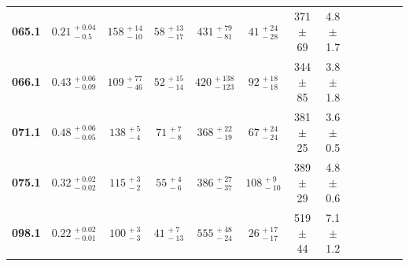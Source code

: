 \begin{table}
{\begin{tabular}{lcccccccccccc}
	\textbf{065.1} & $0.21_{\, -0.5}^{\, +0.04}$ & $158_{\, -10}^{\, +14}$ & $58_{\, -17}^{\, +13}$ & $431_{\, -81}^{\, +79}$ & $41_{\, -28}^{\, +24}$ & 371 $\pm$ 69 & 4.8 $\pm$ 1.7
	\\[1.5mm]
	
	\textbf{066.1} & $0.43_{\, -0.09}^{\, +0.06}$ & $109_{\, -46}^{\, +77}$ & $52_{\, -14}^{\, +15}$ & $420_{\, -123}^{\, +138}$ & $92_{\, -18}^{\, +18}$ & 344 $\pm$ 85 & 3.8 $\pm$ 1.8
	\\[1.5mm]
	
	
	\textbf{071.1} & $0.48_{\, -0.05}^{\, +0.06}$ & $138_{\, -4}^{\, +5}$ & $71_{\, -8}^{\, +7}$ & $368_{\, -19}^{\, +22}$ & $67_{\, -24}^{\, +24}$ & 381 $\pm$ 25 & 3.6 $\pm$ 0.5
	\\[1.5mm]
	
	\textbf{075.1} & $0.32_{\, -0.02}^{\, +0.02}$ & $115_{\, -2}^{\, +3}$ & $55_{\, -6}^{\, +4}$ & $386_{\, -37}^{\, +27}$ & $108_{\, -10}^{\, +9}$ & 389 $\pm$ 29 & 4.8 $\pm$ 0.6
	\\[1.5mm]
	

	\textbf{098.1} & $0.22_{\, -0.01}^{\, +0.02}$ & $100_{\, -3}^{\, +3}$ & $41_{\, -13}^{\, +7}$ & $555_{\, -24}^{\, +48}$ & $26_{\, -17}^{\, +17}$ & 519 $\pm$ 44 & 7.1 $\pm$ 1.2
	\\[1.5mm]
	
	

\end{tabular}}
\end{table}
